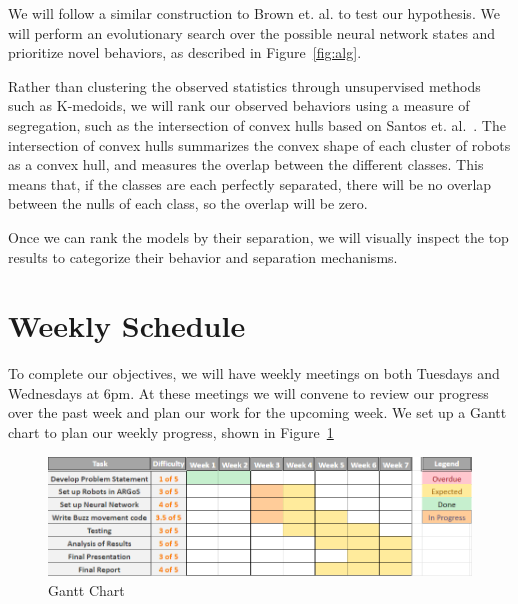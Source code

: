 \documentclass[conference]{IEEEtran}
\begin{document}
We will follow a similar construction to Brown et. al. to test our hypothesis. 
We will perform an evolutionary search over the possible neural network states and prioritize novel behaviors, as described in Figure~\ref{fig:alg}. 

Rather than clustering the observed statistics through unsupervised methods such as K-medoids, we will rank our observed behaviors using a measure of segregation, such as the intersection of convex hulls based on Santos et. al.~\cite{c6}.
The intersection of convex hulls summarizes the convex shape of each cluster of robots as a convex hull, and measures the overlap between the different classes.
This means that, if the classes are each perfectly separated, there will be no overlap between the nulls of each class, so the overlap will be zero. 

Once we can rank the models by their separation, we will visually inspect the top results to categorize their behavior and separation mechanisms. 

\section{Weekly Schedule}
To complete our objectives, we will have weekly meetings on both Tuesdays and Wednesdays at 6pm. At these meetings we will convene to review our progress over the past week and plan our work for the upcoming week. 
We set up a Gantt chart to plan our weekly progress, shown in Figure~\ref{fig:gantt_chart}
\begin{figure}
    \centering
    \includegraphics[width=\linewidth]{gantt_chart.PNG}
    \caption{Gantt Chart}
    \label{fig:gantt_chart}
\end{figure}









\end{document}
